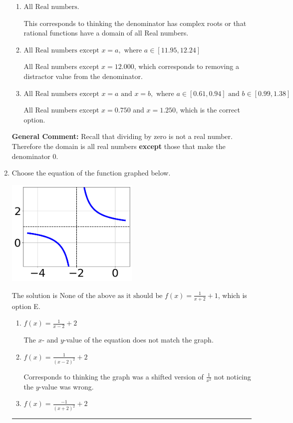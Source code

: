 \documentclass{extbook}[14pt]
\newcommand{\litem}[1]{\item #1

\rule{\textwidth}{0.4pt}}
\begin{document}
\begin{enumerate}
{\begin{enumerate}[label=\Alph*.]
All Real numbers except $x = 0.750$, which corresponds to removing only 1 value from the denominator.
\item \( \text{All Real numbers.} \)

This corresponds to thinking the denominator has complex roots or that rational functions have a domain of all Real numbers.
\item \( \text{All Real numbers except } x = a, \text{ where } a \in [11.95, 12.24] \)

All Real numbers except $x = 12.000$, which corresponds to removing a distractor value from the denominator.
\item \( \text{All Real numbers except } x = a \text{ and } x = b, \text{ where } a \in [0.61, 0.94] \text{ and } b \in [0.99, 1.38] \)

All Real numbers except $x = 0.750$ and $x = 1.250$, which is the correct option.
\end{enumerate}

\textbf{General Comment:} Recall that dividing by zero is not a real number. Therefore the domain is all real numbers \textbf{except} those that make the denominator 0.
}
\litem{
Choose the equation of the function graphed below.

\begin{center}
    \includegraphics[width=0.5\textwidth]{../Figures/rationalGraphToEquationCopyB.png}
\end{center}




The solution is \( \text{None of the above as it should be } f(x) = \frac{1}{x + 2} + 1 \), which is option E.\begin{enumerate}[label=\Alph*.]
\item \( f(x) = \frac{1}{x - 2} + 2 \)

The $x$- and $y$-value of the equation does not match the graph.
\item \( f(x) = \frac{1}{(x - 2)^2} + 2 \)

Corresponds to thinking the graph was a shifted version of $\frac{1}{x^2}$ not noticing the $y$-value was wrong.
\item \( f(x) = \frac{-1}{(x + 2)^2} + 2 \)


\end{enumerate}}
\end{enumerate}
\end{document}
